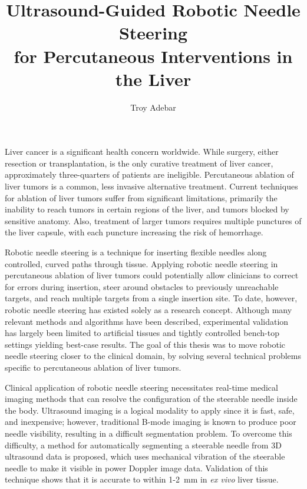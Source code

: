 \documentclass[12pt,twoside]{report}
\begin{document}
\renewcommand{\thepage}{\roman{page}}%

\title{Ultrasound-Guided Robotic Needle Steering\\
            for Percutaneous Interventions in the Liver}
\author{Troy Adebar}
 
\beforepreface
Liver cancer is a significant health concern worldwide. While surgery, either resection or transplantation, is the only curative treatment of liver cancer, approximately three-quarters of patients are ineligible. Percutaneous ablation of liver tumors is a common, less invasive alternative treatment. Current techniques for ablation of liver tumors suffer from significant limitations, primarily the inability to reach tumors in certain regions of the liver, and tumors blocked by sensitive anatomy. Also, treatment of larger tumors requires multiple punctures of the liver capsule, with each puncture increasing the risk of hemorrhage.

Robotic needle steering is a technique for inserting flexible needles along controlled, curved paths through tissue. Applying robotic needle steering in percutaneous ablation of liver tumors could potentially allow clinicians to correct for errors during insertion, steer around obstacles to previously unreachable targets, and reach multiple targets from a single insertion site. To date, however, robotic needle steering has existed solely as a research concept. Although many relevant methods and algorithms have been described, experimental validation has largely been limited to artificial tissues and tightly controlled bench-top settings yielding best-case results. The goal of this thesis was to move robotic needle steering closer to the clinical domain, by solving several technical problems specific to percutaneous ablation of liver tumors.

Clinical application of robotic needle steering necessitates real-time medical imaging methods that can resolve the configuration of the steerable needle inside the body. Ultrasound imaging is a logical modality to apply since it is fast, safe, and inexpensive; however, traditional B-mode imaging is known to produce poor needle visibility, resulting in a difficult segmentation problem. To overcome this difficulty, a method for automatically segmenting a steerable needle from 3D ultrasound data is proposed, which uses mechanical vibration of the steerable needle to make it visible in power Doppler image data. Validation of this technique shows that it is accurate to within 1-2~mm in \textit{ex vivo} liver tissue.
\end{document}
